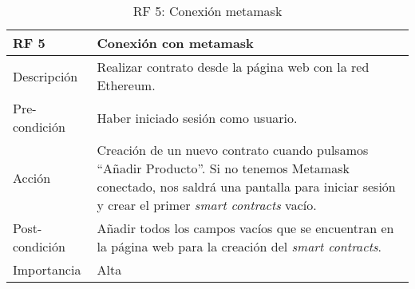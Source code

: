 \begin{table}[htbp]
\begin{center}
\begin{tabular}{|l|p{10cm}|}
\hline
\textbf{RF 5} & \textbf{Conexión con metamask}                                                                                                                                                      \\ \hline
Descripción   & Realizar contrato desde la página web con la red Ethereum.                                                                                                                          \\ \hline
Pre-condición   & Haber iniciado sesión como usuario.                                                                                                                                                 \\ \hline
Acción        & Creación de un nuevo contrato cuando pulsamos ``Añadir Producto''. Si no tenemos Metamask conectado, nos saldrá una pantalla para iniciar sesión y crear el primer \textit{smart contracts} vacío. \\ \hline
Post-condición & Añadir todos los campos vacíos que se encuentran en la página web para la creación del \textit{smart contracts}.            \\ \hline
Importancia   & Alta                                                                                                                                                                                \\ \hline
\end{tabular}
\caption{RF 5: Conexión metamask}
	\label{tabla:tablaB5}
	\end{center}
\end{table}

